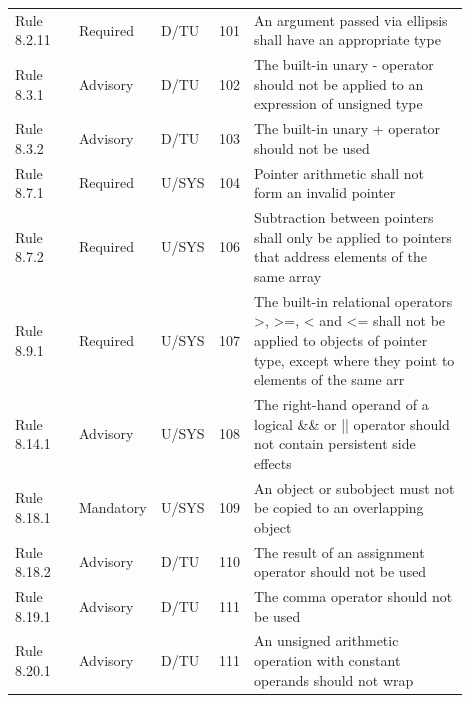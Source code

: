 \documentclass[10pt,letterpaper]{article}
\begin{document}
\begin{longtable}{p{0.14\linewidth}p{0.14\linewidth}p{0.1\linewidth}p{0.045\linewidth}p{0.475\linewidth}}
Rule 8.2.11 & Required & D/TU & 101 & An argument passed via ellipsis shall have an appropriate type\\
Rule 8.3.1 & Advisory & D/TU & 102 & The built-in unary - operator should not be applied to an expression of unsigned type\\
Rule 8.3.2 & Advisory & D/TU & 103 & The built-in unary + operator should not be used\\
Rule 8.7.1 & Required & U/SYS & 104 & Pointer arithmetic shall not form an invalid pointer\\
Rule 8.7.2 & Required & U/SYS & 106 & Subtraction between pointers shall only be applied to pointers that address elements of the same array\\
Rule 8.9.1 & Required & U/SYS & 107 & The built-in relational operators \textgreater{}, \textgreater{}=, \textless{} and \textless{}= shall not be applied to objects of pointer type, except where they point to elements of the same arr\\
Rule 8.14.1 & Advisory & U/SYS & 108 & The right-hand operand of a logical \&\& or || operator should not contain persistent side effects\\
Rule 8.18.1 & Mandatory & U/SYS & 109 & An object or subobject must not be copied to an overlapping object\\
Rule 8.18.2 & Advisory & D/TU & 110 & The result of an assignment operator should not be used\\
Rule 8.19.1 & Advisory & D/TU & 111 & The comma operator should not be used\\
Rule 8.20.1 & Advisory & D/TU & 111 & An unsigned arithmetic operation with constant operands should not wrap\\
\bottomrule
\end{longtable}
\normalsize
\end{document}

